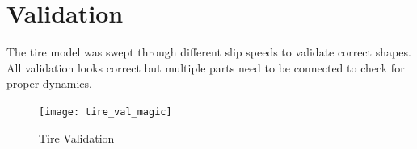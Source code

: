 \documentclass[../SimBALink.tex]{subfiles}
\begin{document}
\section{Validation}

The tire model was swept through different slip speeds to validate correct shapes. All validation looks correct but multiple parts need to be connected to check for proper dynamics. 

\begin{figure}[H]
\center
 \texttt{[image: tire\_val\_magic]}
  \caption{Tire Validation}
\end{figure}
\end{document}
